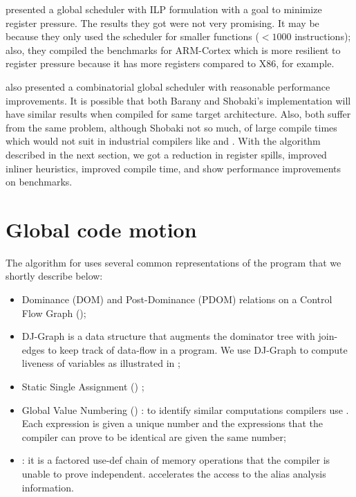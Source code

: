 \documentclass[sigplan,10pt,review,anonymous]{acmart}\settopmatter{printfolios=true,printccs=false,printacmref=false}
\begin{document}
\citet{barany2013} presented a global scheduler with ILP formulation with
a goal to minimize register pressure. The results they got were not very
promising. It may be because they only used the scheduler for smaller functions
($<1000$ instructions); also, they compiled the benchmarks for ARM-Cortex which
is more resilient to register pressure because it has more registers compared to
X86, for example.

\citet{shobaki2013} also presented a combinatorial global scheduler with
reasonable performance improvements. It is possible that both Barany and
Shobaki's implementation will have similar results when compiled for same target
architecture. Also, both suffer from the same problem, although Shobaki not so
much, of large compile times which would not suit in industrial compilers like
\GCC{} and \LLVM{}. With the algorithm described in the next section, we got a
reduction in register spills, improved inliner heuristics, improved compile
time, and show performance improvements on \SPEC{} benchmarks.


\section{Global code motion}

The algorithm for \GCM{} uses several common representations of the
program that we shortly describe below:
\begin{itemize}[leftmargin=*,topsep=0pt]
\item Dominance (DOM) and Post-Dominance (PDOM) relations \cite{dragonbook} on a
  Control Flow Graph (\CFG{});
\item DJ-Graph \cite{Sreedhar1996} is a data structure that augments the
  dominator tree with join-edges to keep track of data-flow in a program. We use
  DJ-Graph to compute liveness of variables as illustrated in \cite{das2012};
\item Static Single Assignment (\SSA{}) \cite{cytron};
\item Global Value Numbering (\GVN{}) \cite{rosen1988global,click1995global}: to
  identify similar computations compilers use \GVN{}.  Each expression is given
  a unique number and the expressions that the compiler can prove to be
  identical are given the same number;
\item \MemorySSA{} \cite{novillo2007memory}: it is a factored use-def chain of
  memory operations that the compiler is unable to prove
  independent. \MemorySSA{} accelerates the access to the alias analysis
  information.
\end{itemize}
\end{document}
